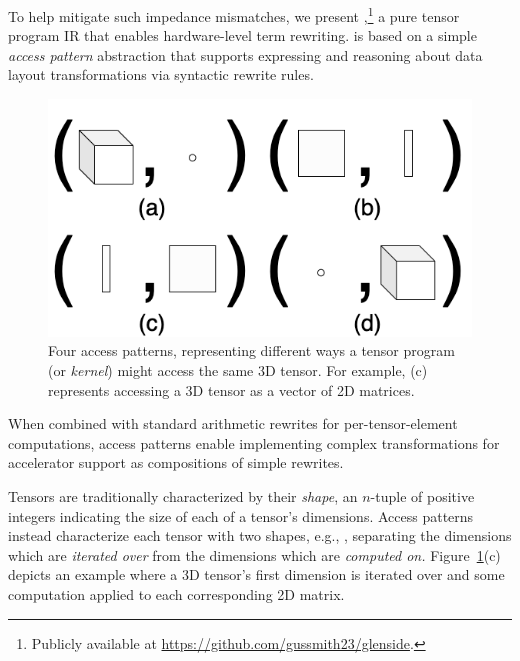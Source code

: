 To help mitigate such impedance mismatches,
  we present \textit{\g},\footnote{Publicly available at \url{https://github.com/gussmith23/glenside}.}
  a pure tensor program IR
  that enables hardware-level term rewriting.
\g is based on a simple
  \textit{access pattern} abstraction that
  supports expressing and reasoning about
  data layout transformations via
  syntactic rewrite rules.
  \begin{figure}
    \centering
    \includegraphics[width=.9\linewidth]{glenside/access-pattern-examples-2x2.png}
    \caption{
      Four access patterns,
        representing different ways
        a
        tensor program
        (or \textit{kernel})
        might access
        the same 3D tensor. 
      For example, (c) represents
        accessing a 3D tensor as
        a vector of 2D matrices.}
    \label{fig:access-pattern-examples}
    \vspace{-1em}
\end{figure}
When combined with standard arithmetic rewrites
  for per-tensor-element computations,
  access patterns enable implementing complex
  transformations for accelerator support as
  compositions of simple rewrites.

Tensors are traditionally characterized
  by their \textit{shape},
  an $n$-tuple 
  of positive integers
  indicating the size of each
  of a tensor's dimensions.
Access patterns instead characterize
  each tensor with two shapes, e.g.,
  , separating
  the dimensions which are \textit{iterated over} from
  the dimensions which are \textit{computed on.}
Figure~\ref{fig:access-pattern-examples}(c)
  depicts an example where a 3D tensor's
  first dimension is iterated over and
  some computation applied to each
  corresponding 2D matrix.

